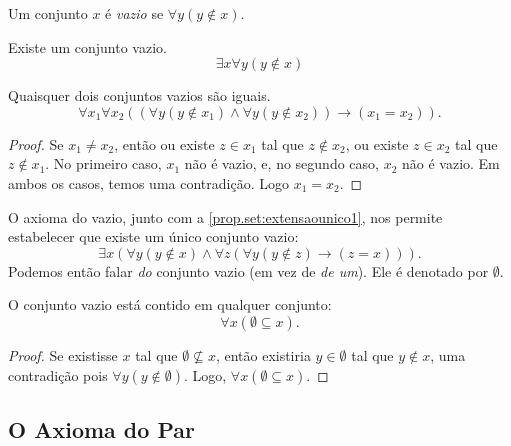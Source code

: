\begin{definition}
    Um conjunto $x$ é \emph{vazio} se $\forall y (y \notin x)$.
\end{definition}

\begin{axiom}[do Vazio] \label{ax:2}
    Existe um conjunto vazio.
        \[
            \boxed{
                \exists x \forall y (y \notin x)
            }
        \]
\end{axiom}

\begin{proposition} \label{prop.set:extensaounico1}
    Quaisquer dois conjuntos vazios são iguais.
        \[
            \forall x_1 \forall x_2 ( (\forall y (y \notin x_1) \land \forall y (y \notin x_2)) \rightarrow (x_1 = x_2) ).
        \]
\end{proposition}

\begin{proof}
Se $x_1 \neq x_2$, então ou existe $z \in x_1$ tal que $z \notin x_2$, ou existe $z \in x_2$ tal que $z \notin x_1$. No primeiro caso, $x_1$ não é vazio, e, no segundo caso, $x_2$ não é vazio. Em ambos os casos, temos uma contradição. Logo $x_1 = x_2$. \blackproof
\end{proof}

\begin{remark}
    O axioma do vazio, junto com a \cref{prop.set:extensaounico1}, nos permite estabelecer que existe um único conjunto vazio:
        \[
            \exists x (\forall y  (y \notin x) \land \forall z(\forall y ( y \notin z ) \rightarrow (z=x) )).
        \]
    Podemos então falar \emph{do} conjunto vazio (em vez de \emph{de um}). Ele é denotado por $\emptyset$.
\end{remark}

\begin{proposition}
    O conjunto vazio está contido em qualquer conjunto:
        \[
          \forall x (\emptyset \subseteq x).
        \]
\end{proposition}

\begin{proof}
    Se existisse $x$ tal que $\emptyset \not\subseteq x$, então existiria $y \in \emptyset$ tal que $y \notin x$, uma contradição pois $\forall y (y \notin \emptyset)$. Logo, $\forall x (\emptyset \subseteq x)$. \blackproof
\end{proof}

\subsection{O Axioma do Par}

